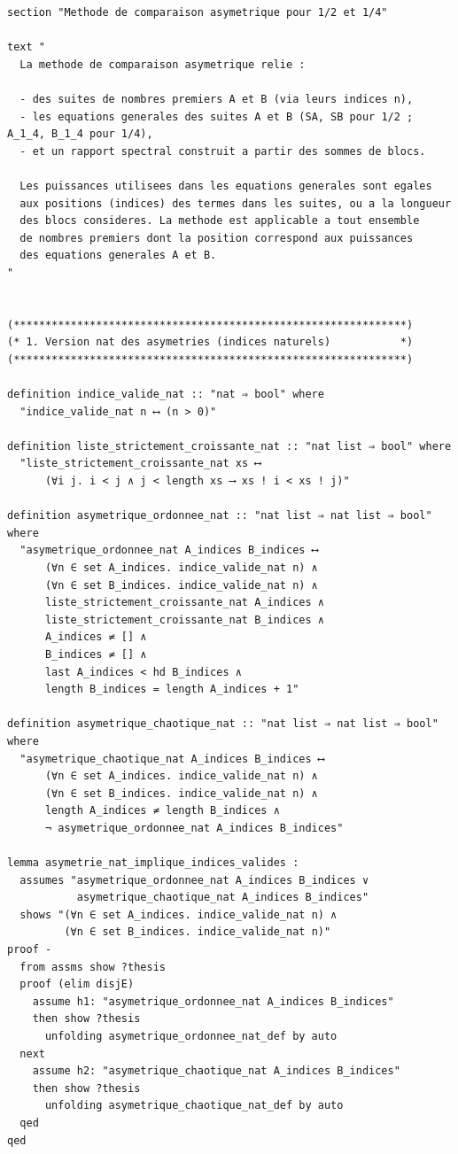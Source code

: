 \documentclass[a4paper,11pt]{article}
\begin{document}
\begin{holcode}[title={\textcolor{white}{File: methode\_spectral.thy -- Part 3/4}}]
\begin{lstlisting}
section "Methode de comparaison asymetrique pour 1/2 et 1/4"

text "
  La methode de comparaison asymetrique relie :

  - des suites de nombres premiers A et B (via leurs indices n),
  - les equations generales des suites A et B (SA, SB pour 1/2 ; A_1_4, B_1_4 pour 1/4),
  - et un rapport spectral construit a partir des sommes de blocs.

  Les puissances utilisees dans les equations generales sont egales
  aux positions (indices) des termes dans les suites, ou a la longueur
  des blocs consideres. La methode est applicable a tout ensemble
  de nombres premiers dont la position correspond aux puissances
  des equations generales A et B.
"


(**************************************************************)
(* 1. Version nat des asymetries (indices naturels)           *)
(**************************************************************)

definition indice_valide_nat :: "nat ⇒ bool" where
  "indice_valide_nat n ⟷ (n > 0)"

definition liste_strictement_croissante_nat :: "nat list ⇒ bool" where
  "liste_strictement_croissante_nat xs ⟷
      (∀i j. i < j ∧ j < length xs ⟶ xs ! i < xs ! j)"

definition asymetrique_ordonnee_nat :: "nat list ⇒ nat list ⇒ bool" where
  "asymetrique_ordonnee_nat A_indices B_indices ⟷
      (∀n ∈ set A_indices. indice_valide_nat n) ∧
      (∀n ∈ set B_indices. indice_valide_nat n) ∧
      liste_strictement_croissante_nat A_indices ∧
      liste_strictement_croissante_nat B_indices ∧
      A_indices ≠ [] ∧
      B_indices ≠ [] ∧
      last A_indices < hd B_indices ∧
      length B_indices = length A_indices + 1"

definition asymetrique_chaotique_nat :: "nat list ⇒ nat list ⇒ bool" where
  "asymetrique_chaotique_nat A_indices B_indices ⟷
      (∀n ∈ set A_indices. indice_valide_nat n) ∧
      (∀n ∈ set B_indices. indice_valide_nat n) ∧
      length A_indices ≠ length B_indices ∧
      ¬ asymetrique_ordonnee_nat A_indices B_indices"

lemma asymetrie_nat_implique_indices_valides :
  assumes "asymetrique_ordonnee_nat A_indices B_indices ∨
           asymetrique_chaotique_nat A_indices B_indices"
  shows "(∀n ∈ set A_indices. indice_valide_nat n) ∧
         (∀n ∈ set B_indices. indice_valide_nat n)"
proof -
  from assms show ?thesis
  proof (elim disjE)
    assume h1: "asymetrique_ordonnee_nat A_indices B_indices"
    then show ?thesis
      unfolding asymetrique_ordonnee_nat_def by auto
  next
    assume h2: "asymetrique_chaotique_nat A_indices B_indices"
    then show ?thesis
      unfolding asymetrique_chaotique_nat_def by auto
  qed
qed
\end{lstlisting}
\end{holcode}
\end{document}
